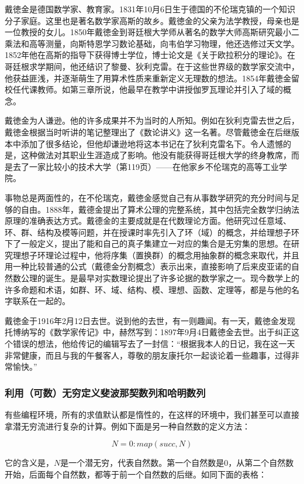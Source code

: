 \documentclass{article}
\begin{document}
戴徳金是德国数学家、教育家。1831年10月6日生于德国的不伦瑞克镇的一个知识分子家庭。这里也是著名数学家高斯的故乡。戴徳金的父亲为法学教授，母亲也是一位教授的女儿。1850年戴徳金到哥廷根大学师从著名的数学大师高斯研究最小二乘法和高等测量，向斯特恩学习数论基础，向韦伯学习物理，他还选修过天文学。1852年他在高斯的指导下获得博士学位，博士论文是《关于欧拉积分的理论》。在哥廷根求学期间，他还结识了黎曼、狄利克雷。在于这些世界级的数学家交流中，他获益匪浅，并逐渐萌生了用算术性质来重新定义无理数的想法。1854年戴徳金留校任代课教师。如第三章所说，他最早在教学中讲授伽罗瓦理论并引入了域的概念。

戴徳金为人谦逊。他的许多成果并不为当时的人所知。例如在狄利克雷去世之后，戴徳金根据当时听讲的笔记整理出了《数论讲义》这一名著。尽管戴徳金在后继版本中添加了很多结论，但他却谦逊地将这本书记在了狄利克雷名下。令人遗憾的是，这种做法对其职业生涯造成了影响。他没有能获得哥廷根大学的终身教席，而是去了一家比较小的技术大学（\cite{Stepanov}第119页）——在他家乡不伦瑞克的高等工业学院。

事物总是两面性的，在不伦瑞克，戴徳金感觉自己有从事数学研究的充分时间与足够的自由。1888年，戴德金提出了算术公理的完整系统，其中包括完全数学归纳法原理的准确表达方式。戴德金的主要成就是在代数理论方面。他研究过任意域、环、群、结构及模等问题，并在授课时率先引入了环（域）的概念，并给理想子环下了一般定义，提出了能和自己的真子集建立一对应的集合是无穷集的思想。在研究理想子环理论过程中，他将序集（置换群）的概念用抽象群的概念来取代，并且用一种比较普通的公式（戴德金分割概念）表示出来，直接影响了后来皮亚诺的自然数公理的诞生。是最早对实数理论提出了许多论据的数学家之一。现今数学上的许多命题和术语，如群、环、域、结构、模、理想、函数、定理等，都是与他的名字联系在一起的。

戴徳金于1916年2月12日去世。说到他的去世，有一则趣闻。有一天，戴徳金发现托博纳写的《数学家传记》中，赫然写到：1897年9月4日戴徳金去世。出于纠正这个错误的想法，他给传记的编辑写去了一封信：“根据我本人的日记，我在这一天非常健康，而且与我的午餐客人，尊敬的朋友康托尔一起谈论着一些趣事，过得非常愉快。”\cite{HanXueTao16}

\subsubsection{利用（可数）无穷定义斐波那契数列和哈明数列}

有些编程环境，所有的求值默认都是惰性的，在这样的环境中，我们甚至可以直接拿潜无穷流进行复杂的计算。例如下面是另一种自然数的定义方法：

\[
N = 0 : map(succ, N)
\]

它的含义是，$N$是一个潜无穷，代表自然数。第一个自然数是0，从第二个自然数开始，后面每个自然数，都等于前一个自然数的后继。如同下面的表格：
\end{document}
